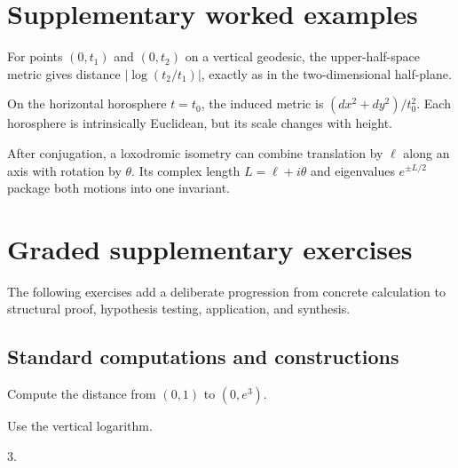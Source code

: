 \section{Supplementary worked examples}
\label{sec:vii36-pedagogy}

\begin{example}\label{ex:vii36-ped-01}
For points \((0,t_1)\) and \((0,t_2)\) on a vertical geodesic, the upper-half-space metric gives distance \(|\log(t_2/t_1)|\), exactly as in the two-dimensional half-plane.
\end{example}

\begin{example}\label{ex:vii36-ped-02}
On the horizontal horosphere \(t=t_0\), the induced metric is \((dx^2+dy^2)/t_0^2\).  Each horosphere is intrinsically Euclidean, but its scale changes with height.
\end{example}

\begin{example}\label{ex:vii36-ped-03}
After conjugation, a loxodromic isometry can combine translation by \(\ell\) along an axis with rotation by \(\theta\).  Its complex length \(L=\ell+i\theta\) and eigenvalues \(e^{\pm L/2}\) package both motions into one invariant.
\end{example}

\section{Graded supplementary exercises}
The following exercises add a deliberate progression from concrete calculation to structural proof, hypothesis testing, application, and synthesis.

\subsection*{Standard computations and constructions}

\begin{exercise}\label{exr:vii36-ped-01}
Compute the distance from \((0,1)\) to \((0,e^3)\).
\end{exercise}

\begin{hint}
Use the vertical logarithm.
\end{hint}

\begin{solution}
\(3\).
\end{solution}

